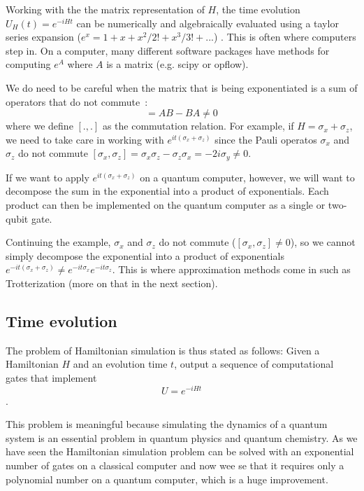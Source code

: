 Working with the the matrix representation of $H$, the time evolution $U_H(t) = e^{-iHt}$ can be numerically and algebraically evaluated using a taylor series expansion ($e^x = 1 + x + x^2/2! + x^3/3! + ... $) . This is often where computers step in. On a computer, many different software packages have methods for computing $e^A$ where $A$ is a matrix (e.g. scipy or opflow).

We do need to be careful when the matrix that is being exponentiated is a sum of operators that do not commute~\cite{Shankar}:
\begin{equation}
[A,B] = AB - BA \neq 0
\end{equation}
where we define $[.,.]$ as the commutation relation.
 For example, if $H = \sigma_x + \sigma_z$, we need to take care in working with $e^{it(\sigma_x + \sigma_z)}$ since the Pauli operatos $\sigma_x$ and $\sigma_z$ do not commute $[\sigma_x, \sigma_z] = \sigma_x \sigma_z - \sigma_z \sigma_x = -2i\sigma_y \neq0$.
 
 If we want to apply $e^{it(\sigma_x + \sigma_z)}$ on a quantum computer, however, we will want to decompose the sum in the exponential into a product of exponentials. Each product can then be implemented on the quantum computer as a single or two-qubit gate. 
 
 Continuing the example, $\sigma_x$ and $\sigma_z$ do not commute ($[\sigma_x, \sigma_z] \neq 0$), so we cannot simply decompose the exponential into a product of exponentials $e^{-it(\sigma_x + \sigma_z)} \neq e^{-it\sigma_x}e^{-it\sigma_z}$. This is where approximation methods come in such as Trotterization (more on that in the next section).

\subsection{Time evolution}


The problem of Hamiltonian simulation is thus stated as follows: Given a Hamiltonian 
$H$ and an evolution time  $t$, output a sequence of computational gates that implement
\begin{equation}\label{eq:u}
U = e^{-iHt}
\end{equation}.

This problem is meaningful because simulating the dynamics of a quantum system is an essential problem in quantum physics and quantum chemistry. As we have seen the Hamiltonian simulation problem can be solved with an exponential number of gates on a classical computer and now wee se that it requires only a polynomial number on a quantum computer, which is a huge improvement.

